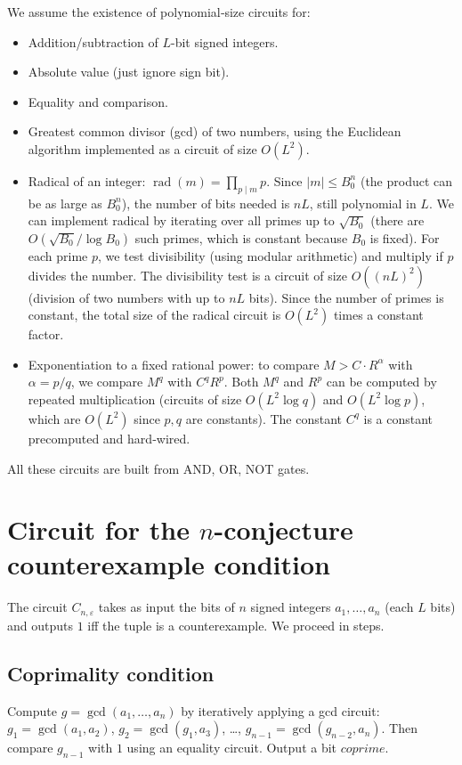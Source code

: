 \documentclass[11pt,a4paper]{article}
\begin{document}
We assume the existence of polynomial‑size circuits for:
\begin{itemize}
\item Addition/subtraction of $L$-bit signed integers.
\item Absolute value (just ignore sign bit).
\item Equality and comparison.
\item Greatest common divisor (gcd) of two numbers, using the Euclidean algorithm implemented as a circuit of size $O(L^2)$.
\item Radical of an integer: $\operatorname{rad}(m) = \prod_{p\mid m} p$. Since $|m|\le B_0^n$ (the product can be as large as $B_0^n$), the number of bits needed is $nL$, still polynomial in $L$. We can implement radical by iterating over all primes up to $\sqrt{B_0}$ (there are $O(\sqrt{B_0}/\log B_0)$ such primes, which is constant because $B_0$ is fixed). For each prime $p$, we test divisibility (using modular arithmetic) and multiply if $p$ divides the number. The divisibility test is a circuit of size $O((nL)^2)$ (division of two numbers with up to $nL$ bits). Since the number of primes is constant, the total size of the radical circuit is $O(L^2)$ times a constant factor.
\item Exponentiation to a fixed rational power: to compare $M > C \cdot R^{\alpha}$ with $\alpha = p/q$, we compare $M^q$ with $C^q R^p$. Both $M^q$ and $R^p$ can be computed by repeated multiplication (circuits of size $O(L^2 \log q)$ and $O(L^2 \log p)$, which are $O(L^2)$ since $p,q$ are constants). The constant $C^q$ is a constant precomputed and hard‑wired.
\end{itemize}
All these circuits are built from AND, OR, NOT gates.

\section{Circuit for the $n$-conjecture counterexample condition}
The circuit $C_{n,\varepsilon}$ takes as input the bits of $n$ signed integers $a_1,\dots,a_n$ (each $L$ bits) and outputs $1$ iff the tuple is a counterexample. We proceed in steps.

\subsection{Coprimality condition}
Compute $g = \gcd(a_1,\dots,a_n)$ by iteratively applying a gcd circuit: $g_1 = \gcd(a_1,a_2)$, $g_2 = \gcd(g_1,a_3)$, …, $g_{n-1} = \gcd(g_{n-2},a_n)$. Then compare $g_{n-1}$ with $1$ using an equality circuit. Output a bit $coprime$.
\end{document}
